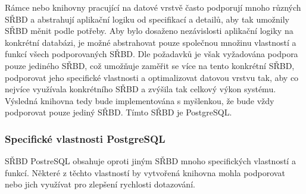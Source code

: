 \documentclass[ing,male,java,dept456]{diploma}						%
\begin{document}
Rámce nebo knihovny pracující na datové vrstvě často podporují mnoho různých SŘBD a abstrahují aplikační logiku od specifikací a detailů, aby tak umožnily SŘBD měnit podle potřeby. Aby bylo dosaženo nezávislosti aplikační logiky na konkrétní databázi, je možné abstrahovat pouze společnou množinu vlastností a funkcí všech podporovaných SŘBD. Dle požadavků je však vyžadována podpora pouze jediného SŘBD, což umožňuje zaměřit se více na tento konkrétní SŘBD, podporovat jeho specifické vlastnosti a optimalizovat datovou vrstvu tak, aby co nejvíce využívala konkrétního SŘBD a zvýšila tak celkový výkon systému. \\
Výsledná knihovna tedy bude implementována s myšlenkou, že bude vždy podporovat pouze jediný SŘBD. Tímto SŘBD je PostgreSQL.

\subsubsection{Specifické vlastnosti PostgreSQL}
\label{subsubsec:PostgreSQL}

SŘBD PostreSQL obsahuje oproti jiným SŘBD mnoho specifických vlastností a funkcí. Některé z těchto vlastností by vytvořená knihovna mohla podporovat nebo jich využívat pro zlepšení rychlosti dotazování.
\end{document}
